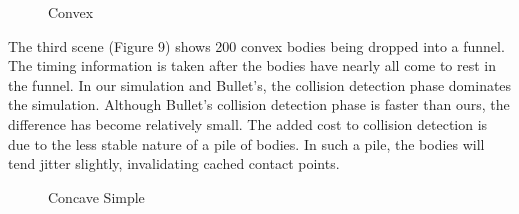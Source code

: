 \documentclass[9pt,twocolumn]{article}
\begin{document}
\begin{figure}[ht]
\centering
{}
\label{Convex}
\caption{Convex}
\end{figure}

The third scene (Figure 9) shows 200 convex bodies being dropped into a funnel. The timing information is taken after the bodies have nearly all come to rest in the funnel. In our simulation and Bullet's, the collision detection phase dominates the simulation. Although Bullet's collision detection phase is faster than ours, the difference has become relatively small. The added cost to collision detection is due to the less stable nature of a pile of  bodies. In such a pile, the bodies will tend jitter slightly, invalidating cached contact points. \newline

\begin{figure}[ht]
\centering
{}
\label{concaveSimple}
\caption{Concave Simple}
\end{figure}
\end{document}
